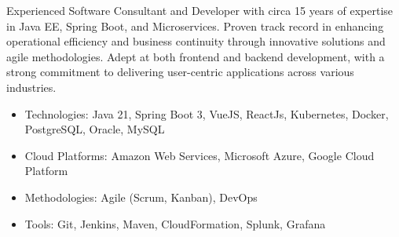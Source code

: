 \documentclass{resume}
\begin{document}
\noindent
\linebreak
Experienced Software Consultant and Developer with circa 15 years of expertise in Java EE, Spring Boot, and Microservices. Proven track record in enhancing operational efficiency and business continuity through innovative solutions and agile methodologies. Adept at both frontend and backend development, with a strong commitment to delivering user-centric applications across various industries.

\begin{itemize}
\item Technologies: Java 21, Spring Boot 3, VueJS, ReactJs, Kubernetes, Docker, PostgreSQL, Oracle, MySQL
\item Cloud Platforms: Amazon Web Services, Microsoft Azure, Google Cloud Platform
\item Methodologies: Agile (Scrum, Kanban), DevOps
\item Tools: Git, Jenkins, Maven, CloudFormation, Splunk, Grafana
\end{itemize}
\end{document}
